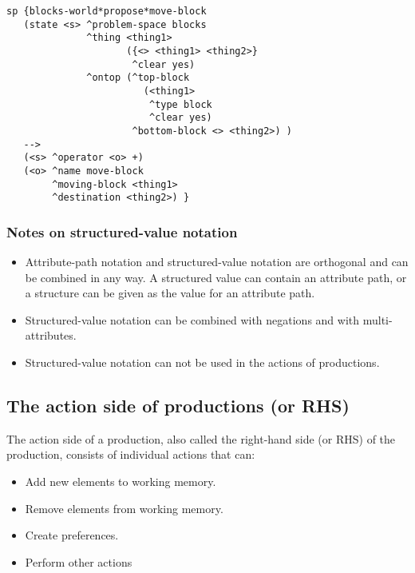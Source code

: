 \begin{verbatim}
sp {blocks-world*propose*move-block
   (state <s> ^problem-space blocks
              ^thing <thing1> 
                     ({<> <thing1> <thing2>}
                      ^clear yes)
              ^ontop (^top-block 
                        (<thing1>
                         ^type block 
                         ^clear yes)
                      ^bottom-block <> <thing2>) )
   -->
   (<s> ^operator <o> +)
   (<o> ^name move-block
        ^moving-block <thing1>
        ^destination <thing2>) }
\end{verbatim}


\subsubsection*{Notes on structured-value notation}

\vspace{-12pt}
\begin{itemize}
	\item 
		Attribute-path notation and structured-value notation are orthogonal and can be combined in any way. A structured value can contain an attribute path, or a structure can be given as the value for an attribute path. 
	\item 
		Structured-value notation can be combined with negations and with multi-attributes. 
	\item 
		Structured-value notation can not be used in the actions of productions.
\end{itemize}


\subsection{The action side of productions (or RHS)}
\label{SYNTAX-pm-rhs}

The action side of a production, also called the right-hand side (or RHS) of the production, consists of individual actions that can:

\vspace{-8pt}
\begin{itemize}
	\item Add new elements to working memory.
	\vspace{-6pt}
	\item Remove elements from working memory.
	\vspace{-6pt}
	\item Create preferences.
	\vspace{-6pt}
	\item Perform other actions
	\vspace{-6pt}
\end{itemize}

